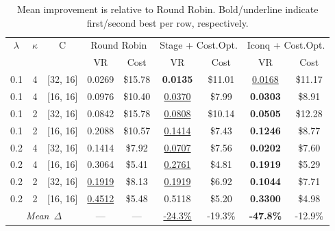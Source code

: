 \documentclass{article}
\begin{document}
\begin{table}[t]
\centering
\footnotesize
\setlength{\tabcolsep}{2.5pt}
\caption{Mean improvement is relative to Round Robin. Bold/underline indicate first/second best per row, respectively.}\label{tab:todo}
\begin{tabular}{c c c || c c | c c | c c}
\toprule
$\lambda$ & $\kappa$ & C & \multicolumn{2}{c|}{Round Robin} & \multicolumn{2}{c|}{Stage + Cost.Opt.} & \multicolumn{2}{c}{Iconq + Cost.Opt.} \\
 &  &  & VR & Cost & VR & Cost & VR & Cost \\
\hline
0.1 & 4 & [32, 16] & 0.0269 & \$15.78 & \textbf{0.0135} & \$11.01 & \underline{0.0168} & \$11.17 \\
0.1 & 4 & [16, 16] & 0.0976 & \$10.40 & \underline{0.0370} & \$7.99 & \textbf{0.0303} & \$8.91 \\
0.1 & 2 & [32, 16] & 0.0842 & \$15.78 & \underline{0.0808} & \$10.14 & \textbf{0.0505} & \$12.28 \\
0.1 & 2 & [16, 16] & 0.2088 & \$10.57 & \underline{0.1414} & \$7.43 & \textbf{0.1246} & \$8.77 \\
0.2 & 4 & [32, 16] & 0.1414 & \$7.92 & \underline{0.0707} & \$7.56 & \textbf{0.0202} & \$7.60 \\
0.2 & 4 & [16, 16] & 0.3064 & \$5.41 & \underline{0.2761} & \$4.81 & \textbf{0.1919} & \$5.29 \\
0.2 & 2 & [32, 16] & \underline{0.1919} & \$8.13 & \underline{0.1919} & \$6.92 & \textbf{0.1044} & \$7.71 \\
0.2 & 2 & [16, 16] & \underline{0.4512} & \$5.48 & 0.5118 & \$5.20 & \textbf{0.3300} & \$4.98 \\
\hline
\multicolumn{3}{c||}{\textit{Mean~$\Delta$}} & --- & --- & \underline{-24.3\%} & -19.3\% & \textbf{-47.8\%} & -12.9\% \\
\bottomrule
\end{tabular}
\end{table}
\end{document}
